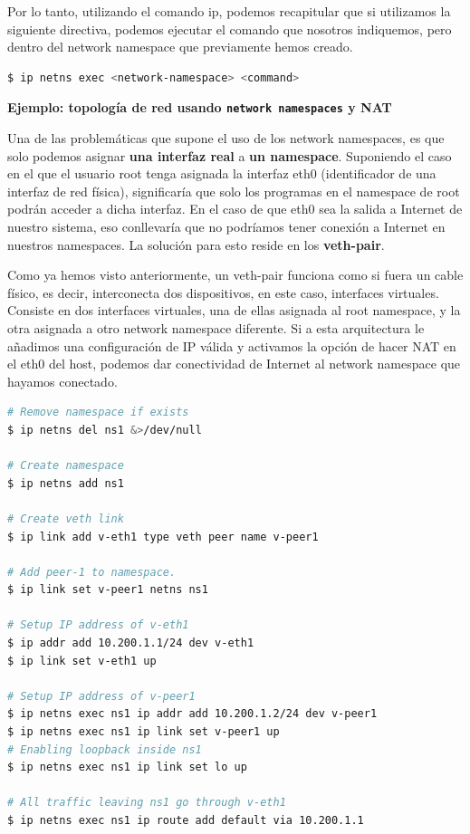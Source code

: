 \documentclass[a4paper, oneside, 12pt]{book}
\begin{document}
	\par \noindent Por lo tanto, utilizando el comando ip, podemos recapitular que si utilizamos la siguiente directiva, podemos ejecutar el comando que nosotros indiquemos, pero dentro del network namespace que previamente hemos creado.
	\begin{lstlisting}[language=bash, caption=Ejecutar cualquier programa con un network namespace]
$ ip netns exec <network-namespace> <command>
	\end{lstlisting}

	\pagebreak
	
	\noindent \textbf{\large Ejemplo: topología de red usando \texttt{network namespaces} y NAT}\\
	\par \noindent Una de las problemáticas que supone el uso de los network namespaces, es que solo podemos asignar \textbf{una interfaz real} a \textbf{un namespace}. Suponiendo el caso en el que el usuario root tenga asignada la interfaz eth0 (identificador de una interfaz de red física), significaría que solo los programas en el namespace de root podrán acceder a dicha interfaz. En el caso de que eth0 sea la salida a Internet de nuestro sistema, eso conllevaría que no podríamos tener conexión a Internet en nuestros namespaces. La solución para esto reside en los \textbf{veth-pair}.
	
	\addvspace{10px}
	
	\par \noindent Como ya hemos visto anteriormente, un veth-pair funciona como si fuera un cable físico, es decir, interconecta dos dispositivos, en este caso, interfaces virtuales. Consiste en dos interfaces virtuales, una de ellas asignada al root namespace, y la otra asignada a otro network namespace diferente. Si a esta arquitectura le añadimos una configuración de IP válida y activamos la opción de hacer NAT en el eth0 del host, podemos dar conectividad de Internet al network namespace que hayamos conectado.
	
	\addvspace{10px}
	
	\begin{lstlisting}[language=bash, caption=Ejemplo configuración de NAT entre eth0 y veth]
# Remove namespace if exists
$ ip netns del ns1 &>/dev/null

# Create namespace
$ ip netns add ns1

# Create veth link
$ ip link add v-eth1 type veth peer name v-peer1

# Add peer-1 to namespace.
$ ip link set v-peer1 netns ns1

# Setup IP address of v-eth1
$ ip addr add 10.200.1.1/24 dev v-eth1
$ ip link set v-eth1 up

# Setup IP address of v-peer1
$ ip netns exec ns1 ip addr add 10.200.1.2/24 dev v-peer1
$ ip netns exec ns1 ip link set v-peer1 up
# Enabling loopback inside ns1
$ ip netns exec ns1 ip link set lo up

# All traffic leaving ns1 go through v-eth1
$ ip netns exec ns1 ip route add default via 10.200.1.1
	\end{lstlisting}
\end{document}
